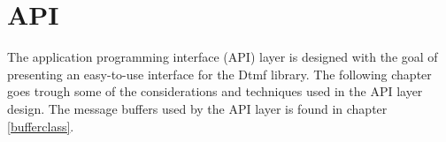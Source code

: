 \chapter{API}\label{chap:api}
The application programming interface (API) layer is designed with the goal of presenting an easy-to-use interface for the Dtmf library. The following chapter goes trough some of the considerations and techniques used in the API layer design. The message buffers used by the API layer is found in chapter \ref{bufferclass}.


















